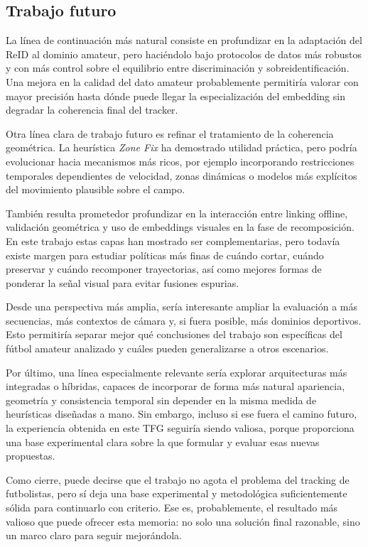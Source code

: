 \documentclass[../MAIN.tex]{subfiles}
\begin{document}
	\subsection{Trabajo futuro}
	
	La línea de continuación más natural consiste en profundizar en la adaptación del ReID al dominio amateur, pero haciéndolo bajo protocolos de datos más robustos y con más control sobre el equilibrio entre discriminación y sobreidentificación. Una mejora en la calidad del dato amateur probablemente permitiría valorar con mayor precisión hasta dónde puede llegar la especialización del embedding sin degradar la coherencia final del tracker.
	
	Otra línea clara de trabajo futuro es refinar el tratamiento de la coherencia geométrica. La heurística \textit{Zone Fix} ha demostrado utilidad práctica, pero podría evolucionar hacia mecanismos más ricos, por ejemplo incorporando restricciones temporales dependientes de velocidad, zonas dinámicas o modelos más explícitos del movimiento plausible sobre el campo.
	
	También resulta prometedor profundizar en la interacción entre linking offline, validación geométrica y uso de embeddings visuales en la fase de recomposición. En este trabajo estas capas han mostrado ser complementarias, pero todavía existe margen para estudiar políticas más finas de cuándo cortar, cuándo preservar y cuándo recomponer trayectorias, así como mejores formas de ponderar la señal visual para evitar fusiones espurias.
	
	Desde una perspectiva más amplia, sería interesante ampliar la evaluación a más secuencias, más contextos de cámara y, si fuera posible, más dominios deportivos. Esto permitiría separar mejor qué conclusiones del trabajo son específicas del fútbol amateur analizado y cuáles pueden generalizarse a otros escenarios.
	
	Por último, una línea especialmente relevante sería explorar arquitecturas más integradas o híbridas, capaces de incorporar de forma más natural apariencia, geometría y consistencia temporal sin depender en la misma medida de heurísticas diseñadas a mano. Sin embargo, incluso si ese fuera el camino futuro, la experiencia obtenida en este TFG seguiría siendo valiosa, porque proporciona una base experimental clara sobre la que formular y evaluar esas nuevas propuestas.
	
	Como cierre, puede decirse que el trabajo no agota el problema del tracking de futbolistas, pero sí deja una base experimental y metodológica suficientemente sólida para continuarlo con criterio. Ese es, probablemente, el resultado más valioso que puede ofrecer esta memoria: no solo una solución final razonable, sino un marco claro para seguir mejorándola.
	
	\newpage
	
\end{document}
